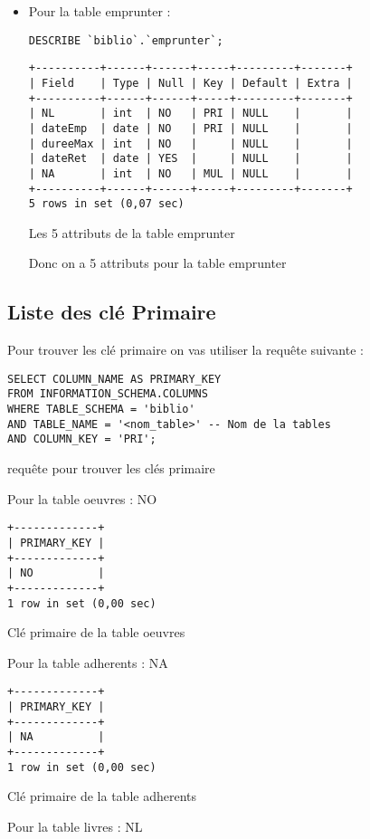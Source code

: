 \documentclass{article}
\begin{document}
\begin{itemize}
	\item Pour la table emprunter :
	      \begin{listing}[H]
		      \begin{verbatim}
DESCRIBE `biblio`.`emprunter`;
\end{verbatim}
		      \begin{verbatim}
+----------+------+------+-----+---------+-------+
| Field    | Type | Null | Key | Default | Extra |
+----------+------+------+-----+---------+-------+
| NL       | int  | NO   | PRI | NULL    |       |
| dateEmp  | date | NO   | PRI | NULL    |       |
| dureeMax | int  | NO   |     | NULL    |       |
| dateRet  | date | YES  |     | NULL    |       |
| NA       | int  | NO   | MUL | NULL    |       |
+----------+------+------+-----+---------+-------+
5 rows in set (0,07 sec)
\end{verbatim}
		      \caption{Les 5 attributs de la table emprunter}
	      \end{listing}
	      Donc on a 5 attributs pour la table emprunter
\end{itemize}
\subsection{Liste des clé Primaire}

Pour trouver les clé primaire on vas utiliser la requête suivante :

\begin{listing}[H]
	\begin{verbatim}
SELECT COLUMN_NAME AS PRIMARY_KEY
FROM INFORMATION_SCHEMA.COLUMNS
WHERE TABLE_SCHEMA = 'biblio'
AND TABLE_NAME = '<nom_table>' -- Nom de la tables
AND COLUMN_KEY = 'PRI';
\end{verbatim}
	\caption{requête pour trouver les clés primaire}
\end{listing}
Pour la table oeuvres : NO
\begin{listing}[H]

	\begin{verbatim}
+-------------+
| PRIMARY_KEY |
+-------------+
| NO          |
+-------------+
1 row in set (0,00 sec)
\end{verbatim}
	\caption{Clé primaire de la table oeuvres}
\end{listing}
Pour la table adherents : NA

\begin{listing}[H]
	\begin{verbatim}
+-------------+
| PRIMARY_KEY |
+-------------+
| NA          |
+-------------+
1 row in set (0,00 sec)
\end{verbatim}
	\caption{Clé primaire de la table adherents}
\end{listing}
Pour la table livres : NL
\end{document}
